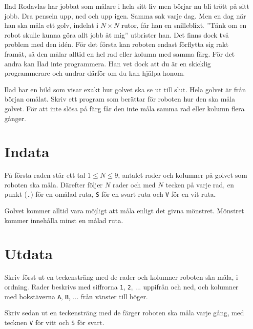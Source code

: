 Ilad Rodavlas har jobbat som målare i hela sitt liv men börjar nu bli trött på sitt jobb.
Dra penseln upp, ned och upp igen.
Samma sak varje dag.
Men en dag när han ska måla ett golv, indelat i $N \times N$ rutor, får han en snilleblixt.
''Tänk om en robot skulle kunna göra allt jobb åt mig'' utbrister han.
Det finns dock två problem med den  idén.
För det första kan roboten endast förflytta sig rakt framåt, så den målar alltid en hel rad eller kolumn med samma färg.
För det andra kan Ilad inte programmera.
Han vet dock att du är en skicklig programmerare och undrar därför om du kan hjälpa honom. 

Ilad har en bild som visar exakt hur golvet ska se ut till slut.
Hela golvet är från början omålat.
Skriv ett program som berättar för roboten hur den ska måla golvet.
För att inte slösa på färg får den inte måla samma rad eller kolumn flera gånger.


\section*{Indata}
På första raden står ett tal $1 \leq N \leq 9$, antalet rader och kolumner på golvet som roboten ska måla.
Därefter följer $N$ rader och med $N$ tecken på varje rad, en punkt (\verb|.|) för en omålad ruta, \verb|S| för en svart ruta och \verb|V| för en vit ruta.

Golvet kommer alltid vara möjligt att måla enligt det givna mönstret. Mönstret kommer innehålla minst en målad ruta. 

\section*{Utdata}
Skriv först ut en teckensträng med de rader och kolumner roboten ska måla, i ordning.
Rader beskrivs med siffrorna \verb|1|, \verb|2|, $\dots$ uppifrån och ned, och kolumner med bokstäverna \verb|A|, \verb|B|, $\dots$ från vänster till höger.

Skriv sedan ut en teckensträng med de färger roboten ska måla varje gång, med tecknen \texttt{V} för vitt och \texttt{S} för svart.


